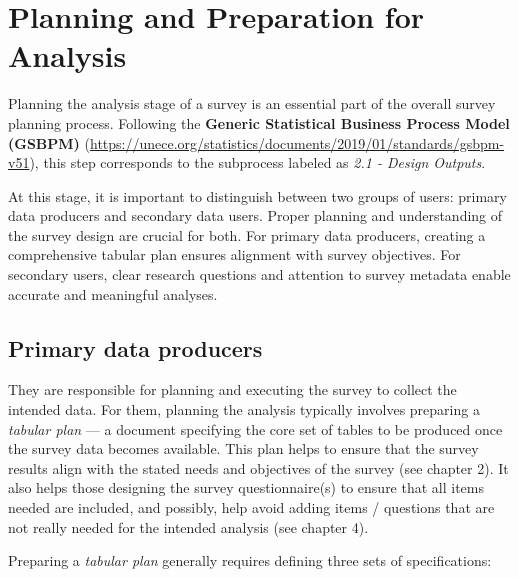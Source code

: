 \documentclass[
  12pt,
]{book}
\begin{document}
\hypertarget{planning-and-preparation-for-analysis}{%
\chapter{Planning and Preparation for Analysis}\label{planning-and-preparation-for-analysis}}

Planning the analysis stage of a survey is an essential part of the overall survey planning process. Following the \textbf{Generic Statistical Business Process Model (GSBPM)} (\url{https://unece.org/statistics/documents/2019/01/standards/gsbpm-v51}), this step corresponds to the subprocess labeled as \emph{2.1 - Design Outputs}.

At this stage, it is important to distinguish between two groups of users: primary data producers and secondary data users. Proper planning and understanding of the survey design are crucial for both. For primary data producers, creating a comprehensive tabular plan ensures alignment with survey objectives. For secondary users, clear research questions and attention to survey metadata enable accurate and meaningful analyses.

\hypertarget{primary-data-producers}{%
\section{Primary data producers}\label{primary-data-producers}}

They are responsible for planning and executing the survey to collect the intended data. For them, planning the analysis typically involves preparing a \emph{tabular plan} --- a document specifying the core set of tables to be produced once the survey data becomes available. This plan helps to ensure that the survey results align with the stated needs and objectives of the survey (see chapter 2). It also helps those designing the survey questionnaire(s) to ensure that all items needed are included, and possibly, help avoid adding items / questions that are not really needed for the intended analysis (see chapter 4).

Preparing a \emph{tabular plan} generally requires defining three sets of specifications:
\end{document}
